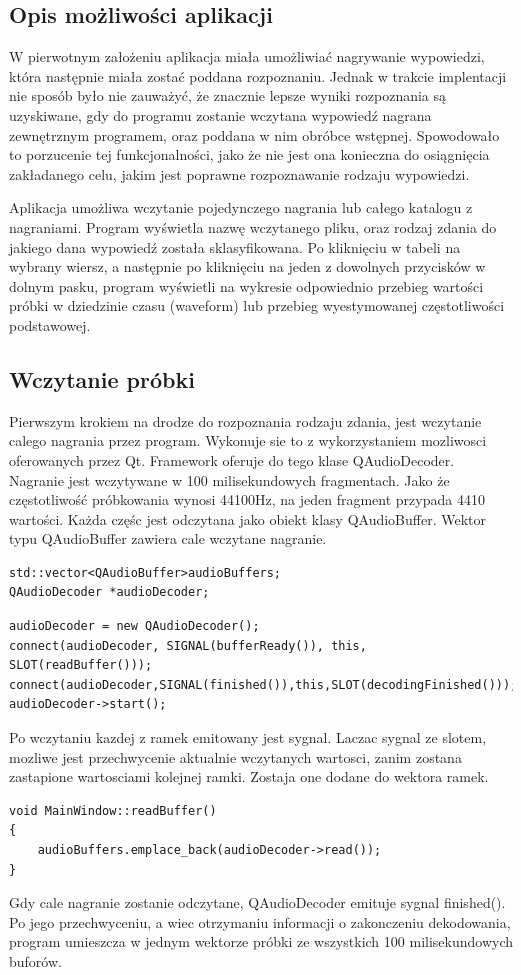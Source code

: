 \documentclass[a4paper,12 pt]{article}
\begin{document}
\subsection{Opis możliwości aplikacji}
W pierwotnym założeniu aplikacja miała umożliwiać nagrywanie wypowiedzi, która następnie miała zostać poddana rozpoznaniu. Jednak w trakcie implentacji nie sposób było nie zauważyć, że znacznie lepsze wyniki rozpoznania są uzyskiwane, gdy do programu zostanie wczytana wypowiedź nagrana zewnętrznym programem, oraz poddana w nim obróbce wstępnej. Spowodowało to porzucenie tej funkcjonalności, jako że nie jest ona konieczna do osiągnięcia zakładanego celu, jakim jest poprawne rozpoznawanie rodzaju wypowiedzi.

Aplikacja umożliwa wczytanie pojedynczego nagrania lub całego katalogu z nagraniami. Program wyświetla nazwę wczytanego pliku, oraz rodzaj zdania do jakiego dana wypowiedź została sklasyfikowana. Po kliknięciu w tabeli na wybrany wiersz, a następnie po kliknięciu na jeden z dowolnych przycisków w dolnym pasku, program wyświetli na wykresie odpowiednio przebieg wartości próbki w dziedzinie czasu (waveform) lub przebieg wyestymowanej częstotliwości podstawowej.
\subsection{Wczytanie próbki}
Pierwszym krokiem na drodze do rozpoznania rodzaju zdania, jest wczytanie calego nagrania przez program. Wykonuje sie to z wykorzystaniem mozliwosci oferowanych przez Qt. Framework oferuje do tego klase QAudioDecoder. 
Nagranie jest wczytywane w 100 milisekundowych fragmentach. Jako że częstotliwość próbkowania wynosi 44100Hz, na jeden fragment przypada 4410 wartości. Każda częśc jest odczytana jako obiekt klasy QAudioBuffer. Wektor typu QAudioBuffer zawiera cale wczytane nagranie.
\begin{lstlisting}
std::vector<QAudioBuffer>audioBuffers;
QAudioDecoder *audioDecoder;
\end{lstlisting}
\begin{lstlisting}
audioDecoder = new QAudioDecoder();
connect(audioDecoder, SIGNAL(bufferReady()), this, SLOT(readBuffer()));
connect(audioDecoder,SIGNAL(finished()),this,SLOT(decodingFinished()));
audioDecoder->start();
\end{lstlisting}
Po wczytaniu kazdej z ramek emitowany jest sygnal. Laczac sygnal ze slotem, mozliwe jest przechwycenie aktualnie wczytanych wartosci, zanim zostana zastapione wartosciami kolejnej ramki.
Zostaja one dodane do wektora ramek.
\begin{lstlisting}
void MainWindow::readBuffer()
{
    audioBuffers.emplace_back(audioDecoder->read());
}
\end{lstlisting}
Gdy cale nagranie zostanie odczytane, QAudioDecoder emituje sygnal finished(). Po jego przechwyceniu, a wiec otrzymaniu informacji o zakonczeniu dekodowania, program umieszcza w jednym wektorze próbki ze wszystkich 100 milisekundowych buforów.
\end{document}
